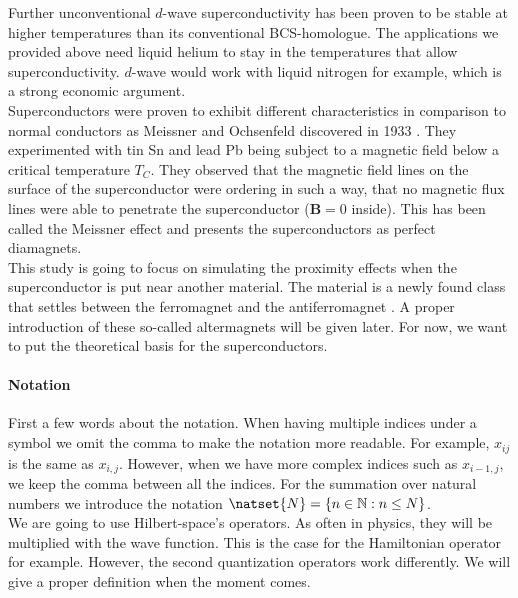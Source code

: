 \documentclass[../main.tex]{subfile}
\begin{document}
Further unconventional $d$-wave superconductivity has been proven to be stable at higher temperatures than its conventional BCS-homologue.
The applications we provided above need liquid helium to stay in the temperatures that allow superconductivity. $d$-wave
would work with liquid nitrogen for example, which is a strong economic argument.\\

Superconductors were proven to exhibit different characteristics in comparison to normal conductors as
Meissner and Ochsenfeld discovered in 1933 \cite{MeissnerOchsenfeld1933}. 
They experimented with tin Sn and lead Pb being subject to a magnetic field below a critical temperature $T_C$. They observed that the magnetic field lines on the surface
of the superconductor were ordering in such a way, that no magnetic flux lines were able to penetrate the superconductor ($\bm{B} = 0$ inside). This has been called the Meissner effect
and presents the superconductors as perfect diamagnets.\\

This study is going to focus on simulating the proximity effects when the superconductor is put near another material. The material is a newly found class 
that settles between the ferromagnet and the antiferromagnet \cite{Smejkal2022}. A proper introduction of these so-called altermagnets will be given later.
 For now, we want to put the theoretical basis for the superconductors.\\

\paragraph{Notation}$~$\\

First a few words about the notation. When having multiple indices under a symbol we omit the comma to make the notation more readable. 
For example, $x_{ij}$ is the same as $x_{i,j}$. However, when we have more complex indices such as $x_{i-1, j}$, we keep the comma between all
the indices. For the summation over natural numbers we introduce the notation $\natset{N} = \{n \in \mathbb{N}: n\leq N\}$.\\

We are going to use Hilbert-space's operators. As often in physics, they will be multiplied with the wave function. This is the case for the Hamiltonian 
operator for example. However, the second quantization operators work differently. We will give a proper definition when the moment comes.
\end{document}
